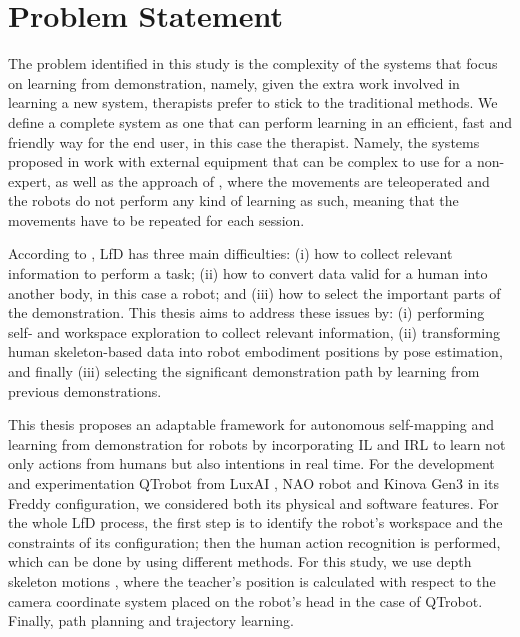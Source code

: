 \documentclass[thesis]{mas_proposal}
\begin{document}
\section{Problem Statement}
    
    The problem identified in this study is the complexity of the systems that focus on learning from demonstration, namely, given the extra work involved in learning a new system, therapists prefer to stick to the traditional methods. We define a complete system as one that can perform learning in an efficient, fast and friendly way for the end user, in this case the therapist. Namely, the systems proposed in \cite{Hua2021, Koenemann2012} work with external equipment that can be complex to use for a non-expert, as well as the approach of \cite{Si2021, Assad2020, Kulikovskiy2021}, where the movements are teleoperated and the robots do not perform any kind of learning as such, meaning that the movements have to be repeated for each session.
    
    According to \cite{Lopes2005}, LfD has three main difficulties: (i) how to collect relevant information to perform a task; (ii) how to convert data valid for a human into another body, in this case a robot; and (iii) how to select the important parts of the demonstration. This thesis aims to address these issues by: (i) performing self- and workspace exploration to collect relevant information, (ii) transforming human skeleton-based data into robot embodiment positions by pose estimation, and finally (iii) selecting the significant demonstration path by learning from previous demonstrations.
    
    This thesis proposes an adaptable framework for autonomous self-mapping and learning from demonstration for robots by incorporating IL and IRL to learn not only actions from humans but also intentions in real time. For the development and experimentation QTrobot from LuxAI \cite{qtrobot_safety_manual}, NAO robot and Kinova Gen3 in its Freddy configuration, we considered both its physical and software features. For the whole LfD process, the first step is to identify the robot's workspace and the constraints of its configuration; then the human action recognition is performed, which can be done by using different methods. For this study, we use depth skeleton motions \cite{Chen2016}, where the teacher's position is calculated with respect to the camera coordinate system placed on the robot's head in the case of QTrobot. Finally, path planning and trajectory learning.
 
\end{document}
